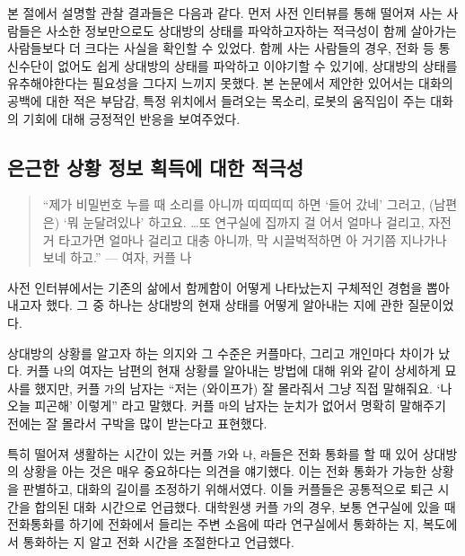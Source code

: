 본 절에서 설명할 관찰 결과들은 다음과 같다. 먼저 사전 인터뷰를 통해 떨어져 사는 사람들은 사소한 정보만으로도 상대방의 상태를 파악하고자하는 적극성이 함께 살아가는 사람들보다 더 크다는 사실을 확인할 수 있었다. 함께 사는 사람들의 경우, 전화 등 통신수단이 없어도 쉽게 상대방의 상태를 파악하고 이야기할 수 있기에, 상대방의 상태를 유추해야한다는 필요성을 그다지 느끼지 못했다. 본 논문에서 제안한  있어서는 대화의 공백에 대한 적은 부담감, 특정 위치에서 들려오는 목소리, 로봇의 움직임이 주는 대화의 기회에 대해 긍정적인 반응을 보여주었다.



\subsection{은근한 상황 정보 획득에 대한 적극성}

\begin{quote}
``제가 비밀번호 누를 때 소리를 아니까 띠띠띠띠 하면 `들어 갔네' 그러고, (남편은) `뭐 눈달려있나' 하고요. \ldots 또 연구실에 집까지 걸 어서 얼마나 걸리고, 자전거 타고가면 얼마나 걸리고 대충 아니까, 막 시끌벅적하면 아 거기쯤 지나가나 보네 하고.'' --- 여자, 커플 나
\end{quote}

사전 인터뷰에서는 기존의 삶에서 함께함이 어떻게 나타났는지 구체적인 경험을 뽑아내고자 했다. 그 중 하나는 상대방의 현재 상태를 어떻게 알아내는 지에 관한 질문이었다.

상대방의 상황를 알고자 하는 의지와 그 수준은 커플마다, 그리고 개인마다 차이가 났다. 커플 \texttt{나}의 여자는 남편의 현재 상황를 알아내는 방법에 대해 위와 같이 상세하게 묘사를 했지만, 커플 \texttt{가}의 남자는 ``저는 (와이프가) 잘 몰라줘서 그냥 직접 말해줘요. `나 오늘 피곤해' 이렇게'' 라고 말했다. 커플 \texttt{마}의 남자는 눈치가 없어서 명확히 말해주기 전에는 잘 몰라서 구박을 많이 받는다고 표현했다.

특히 떨어져 생활하는 시간이 있는 커플 \texttt{가}와 \texttt{나}, \texttt{라}들은 전화 통화를 할 때 있어 상대방의 상황을 아는 것은 매우 중요하다는 의견을 얘기했다. 이는 전화 통화가 가능한 상황을 판별하고, 대화의 길이를 조정하기 위해서였다. 이들 커플들은 공통적으로 퇴근 시간을 합의된 대화 시간으로 언급했다. 대학원생 커플 \texttt{가}의 경우, 보통 연구실에 있을 때 전화통화를 하기에 전화에서 들리는 주변 소음에 따라 연구실에서 통화하는 지, 복도에서 통화하는 지 알고 전화 시간을 조절한다고 언급했다.

